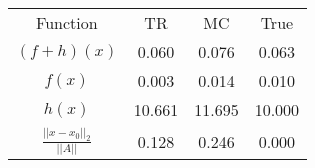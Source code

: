 \begin{tabular}{| c |c |c |c |}
    \hline
    \rowcolor[gray]{0.9}
\multicolumn{4}{|c|}{Minima} \\ \hline Function & TR & MC & True \\
    \hline
  \rowcolor[gray]{0.7}
    $ (f + h)(x) $ & 0.060 & 0.076 & 0.063 \\
  \hline
  \rowcolor[gray]{0.8}
    $ f(x) $ & 0.003 & 0.014 & 0.010 \\
  \hline
  \rowcolor[gray]{0.7}
    $ h(x) $ & 10.661 & 11.695 & 10.000 \\
  \hline
  \rowcolor[gray]{0.8}
    $ \frac{||x - x_0||_2}{||A||} $ & 0.128 & 0.246 & 0.000 \\
  \hline
\end{tabular}
